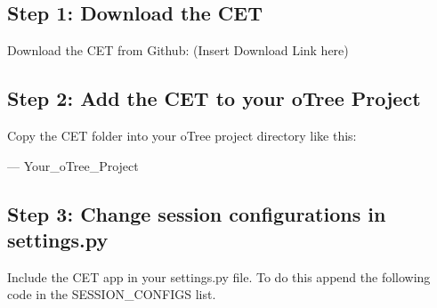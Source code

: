 \documentclass[letterpaper,10pt,english]{sphinxmanual}
\begin{document}
\subsection{Step 1: Download the CET}
\label{\detokenize{setup_in_otree:step-1-download-the-cet}}
Download the CET from Github: (Insert Download Link here)


\subsection{Step 2: Add the CET to your oTree Project}
\label{\detokenize{setup_in_otree:step-2-add-the-cet-to-your-otree-project}}
Copy the CET folder into your oTree project directory like this:
\begin{description}
\item[{— Your\_oTree\_Project}] \leavevmode
{}

\end{description}


\subsection{Step 3: Change session configurations in settings.py}
\label{\detokenize{setup_in_otree:step-3-change-session-configurations-in-settings-py}}
Include the CET app in your settings.py file. To do this append the following code in the
SESSION\_CONFIGS list.

\begin{sphinxVerbatim}[commandchars=\\\{\}]
    \PYG{p}{[}\PYG{p}{]}
\end{sphinxVerbatim}
\end{document}

